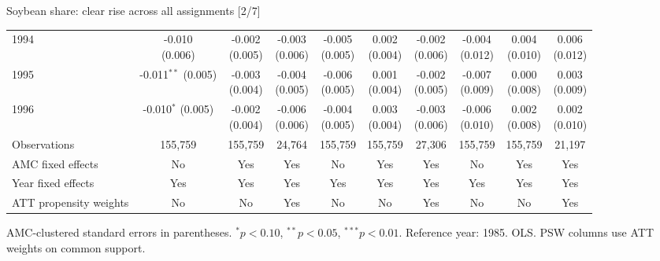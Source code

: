 \documentclass[aspectratio=169]{beamer}
\begin{document}
\begin{frame}{Soybean share: clear rise across all assignments [2/7]}
{\begin{tabular}{@{}l*{9}{c}@{}}
1994 & \shortstack{-0.010\\(0.006)} & \shortstack{-0.002\\(0.005)} & \shortstack{-0.003\\(0.006)} & \shortstack{-0.005\\(0.005)} & \shortstack{0.002\\(0.004)} & \shortstack{-0.002\\(0.006)} & \shortstack{-0.004\\(0.012)} & \shortstack{0.004\\(0.010)} & \shortstack{0.006\\(0.012)} \\
1995 & \shortstack{-0.011$^{**}$\\(0.005)} & \shortstack{-0.003\\(0.004)} & \shortstack{-0.004\\(0.005)} & \shortstack{-0.006\\(0.005)} & \shortstack{0.001\\(0.004)} & \shortstack{-0.002\\(0.005)} & \shortstack{-0.007\\(0.009)} & \shortstack{0.000\\(0.008)} & \shortstack{0.003\\(0.009)} \\
1996 & \shortstack{-0.010$^{*}$\\(0.005)} & \shortstack{-0.002\\(0.004)} & \shortstack{-0.006\\(0.006)} & \shortstack{-0.004\\(0.005)} & \shortstack{0.003\\(0.004)} & \shortstack{-0.003\\(0.006)} & \shortstack{-0.006\\(0.010)} & \shortstack{0.002\\(0.008)} & \shortstack{0.002\\(0.010)} \\
\midrule
Observations & 155,759 & 155,759 & 24,764 & 155,759 & 155,759 & 27,306 & 155,759 & 155,759 & 21,197 \\
AMC fixed effects & No & Yes & Yes & No & Yes & Yes & No & Yes & Yes \\
Year fixed effects & Yes & Yes & Yes & Yes & Yes & Yes & Yes & Yes & Yes \\
ATT propensity weights & No & No & Yes & No & No & Yes & No & No & Yes \\
\bottomrule
\end{tabular}%
}
\vspace{0.1em}
{\tiny\color{ZMidGray} AMC-clustered standard errors in parentheses. $^{*}p<0.10$, $^{**}p<0.05$, $^{***}p<0.01$. Reference year: 1985. OLS. PSW columns use ATT weights on common support.}
\end{frame}
\end{document}
